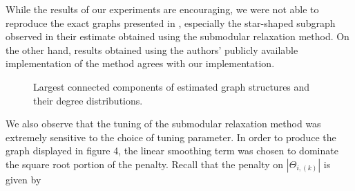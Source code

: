 \documentclass{uwstat572}
\theoremstyle{remark}
\theoremstyle{definition}
\begin{document}
While the results of our experiments are encouraging, we were not able to reproduce the exact graphs presented in \cite{Defazio2012}, especially the star-shaped subgraph observed in their estimate obtained using the submodular relaxation method.  On the other hand, results obtained using the authors' publicly available implementation of the method agrees with our implementation.  

\begin{figure}
\centering
{}

\centering
{}


\caption{Largest connected components of estimated graph structures and their degree distributions.}
\label{graphs}
\end{figure}
We also observe that the tuning of the submodular relaxation method was extremely sensitive to the choice of tuning parameter.  In order to produce the graph displayed in figure 4, the linear smoothing term was chosen to dominate the square root portion of the penalty.  Recall that the penalty on $|\Theta_{i,(k)}|$ is given by
\end{document}
